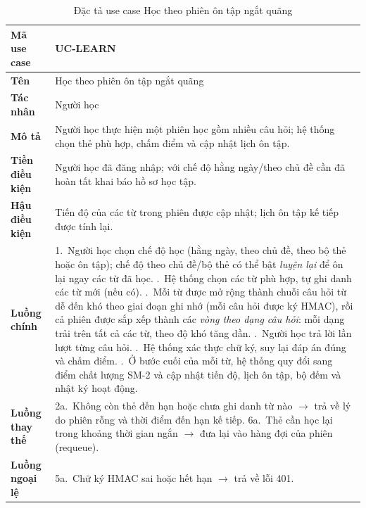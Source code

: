 \begin{table}[H]
  \centering
  \small
  \renewcommand{\arraystretch}{1.3}
  \begin{tabular}{|p{3.0cm}|p{11.4cm}|}
    \hline
    \textbf{Mã use case} & UC-LEARN \\ \hline
    \textbf{Tên} & Học theo phiên ôn tập ngắt quãng \\ \hline
    \textbf{Tác nhân} & Người học \\ \hline
    \textbf{Mô tả} & Người học thực hiện một phiên học gồm nhiều câu hỏi; hệ thống chọn thẻ phù hợp, chấm điểm và cập nhật lịch ôn tập. \\ \hline
    \textbf{Tiền điều kiện} & Người học đã đăng nhập; với chế độ hằng ngày/theo chủ đề cần đã hoàn tất khai báo hồ sơ học tập. \\ \hline
    \textbf{Hậu điều kiện} & Tiến độ của các từ trong phiên được cập nhật; lịch ôn tập kế tiếp được tính lại. \\ \hline
    \textbf{Luồng chính} &
      1.~Người học chọn chế độ học (hằng ngày, theo chủ đề, theo bộ thẻ hoặc ôn tập); chế độ theo chủ đề/bộ thẻ có thể bật \textit{luyện lại} để ôn lại ngay các từ đã học. \newline
      2.~Hệ thống chọn các từ phù hợp, tự ghi danh các từ mới (nếu có). \newline
      3.~Mỗi từ được mở rộng thành chuỗi câu hỏi từ dễ đến khó theo giai đoạn ghi nhớ (mỗi câu hỏi được ký HMAC), rồi cả phiên được sắp xếp thành các \textit{vòng theo dạng câu hỏi}: mỗi dạng trải trên tất cả các từ, theo độ khó tăng dần. \newline
      4.~Người học trả lời lần lượt từng câu hỏi. \newline
      5.~Hệ thống xác thực chữ ký, suy lại đáp án đúng và chấm điểm. \newline
      6.~Ở bước cuối của mỗi từ, hệ thống quy đổi sang điểm chất lượng SM-2 và cập nhật tiến độ, lịch ôn tập, bộ đếm và nhật ký hoạt động. \\ \hline
    \textbf{Luồng thay thế} &
      2a.~Không còn thẻ đến hạn hoặc chưa ghi danh từ nào $\rightarrow$ trả về lý do phiên rỗng và thời điểm đến hạn kế tiếp. \newline
      6a.~Thẻ cần học lại trong khoảng thời gian ngắn $\rightarrow$ đưa lại vào hàng đợi của phiên (requeue). \\ \hline
    \textbf{Luồng ngoại lệ} &
      5a.~Chữ ký HMAC sai hoặc hết hạn $\rightarrow$ trả về lỗi 401. \\ \hline
  \end{tabular}
  \caption{Đặc tả use case Học theo phiên ôn tập ngắt quãng}
  \label{tab:uc-learn}
\end{table}

